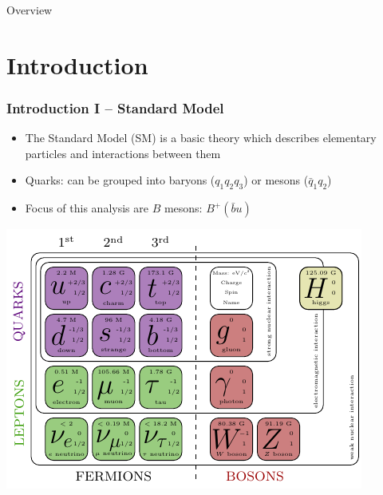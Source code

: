 \documentclass[serif]{beamer}
\begin{document}
\newcommand\tocforsect[2]{%
	\begingroup
	\edef\safesection{\thesection}
	\setcounter{section}{#1}
	\tableofcontents[#2,currentsection]
	\setcounter{section}{\safesection}
	\endgroup
}


\begin{frame}[t]{Overview}
\only<1>{\tocforsect{1}{sectionstyle=shaded,subsectionstyle=shaded}}
\end{frame}

\section{Introduction} 

\begin{frame}[t]
\frametitle{Introduction I -- Standard Model}
\small
\vspace{-3mm}
\begin{block}{}
	\begin{itemize}
		\item The Standard Model (SM) is a basic theory which describes elementary particles and interactions between them
		\item Quarks: can be grouped into baryons ($q_1q_2q_3$) or mesons ($\bar q_1 q_2$)
		\item Focus of this analysis are $B$ mesons: $B^+(\bar b u)$
	\end{itemize}
\end{block}

\begin{center}
\includegraphics[scale=0.9]{texfig/SM}
\end{center}
\end{frame}
\end{document}
